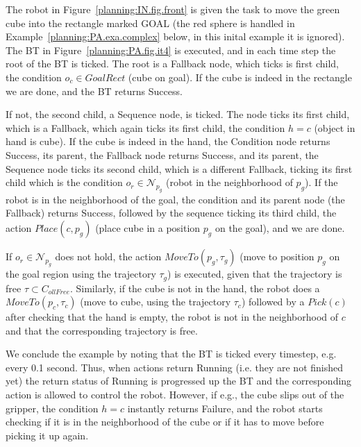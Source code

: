 \begin{example}
\label{planning:PA.exa.simple}

The robot in Figure~\ref{planning:IN.fig.front} is given the task to move the green cube into the rectangle marked GOAL
(the red sphere is handled in Example~\ref{planning:PA.exa.complex} below, in this inital example it is ignored).
The BT  in Figure~\ref{planning:PA.fig.it4} is executed, and in  each time step the root of the BT is ticked. The root is a Fallback node, which ticks is first child, the condition $o_c \in GoalRect$ (cube on goal). If the cube is indeed in the rectangle we are done, and the BT returns Success.

If not, the second child, a Sequence node, is ticked. The node ticks its first child, which is a Fallback, which again ticks its first child, the condition 
$h = c$ (object in hand is cube). If the cube is indeed in the hand, the Condition node returns Success, its parent, the Fallback node returns Success, and its parent, the Sequence node ticks its second child, which is a different Fallback, ticking its first child which is the condition $o_r \in \mathcal{N}_{p_g}$ (robot in the neighborhood of $p_g$). If the robot is in the neighborhood of the goal, the condition and its parent node (the Fallback) returns Success, followed by the sequence ticking its third child, the action $Place(c,p_g)$ (place cube in a position $p_g$ on the goal), and we are done.

If $o_r \in \mathcal{N}_{p_g}$ does not hold, the action $MoveTo(p_g,\tau_g)$ (move to position $p_g$ on the goal region using the trajectory $\tau_g$) is executed, given that the trajectory is free $\tau \subset C_{ollFree}$.
Similarly, if the cube is not in the hand, the robot does a $MoveTo(p_c,\tau_c)$ (move to cube, using the trajectory $\tau_c$) followed by a $Pick(c)$ after checking that the 
hand is empty, the robot is not in the neighborhood of $c$ and that the
corresponding trajectory is free.

We conclude the example by noting that the BT is ticked every timestep, e.g. every 0.1 second. Thus, when actions return Running (i.e. they are not finished yet) the return status of Running is progressed up the BT and the corresponding action is allowed to control the robot. However, if e.g., the cube slips out of the gripper, the condition $h = c$ instantly returns Failure, and the robot starts checking if it is in the neighborhood of the cube or if it has to move before picking it up again.
\end{example}




